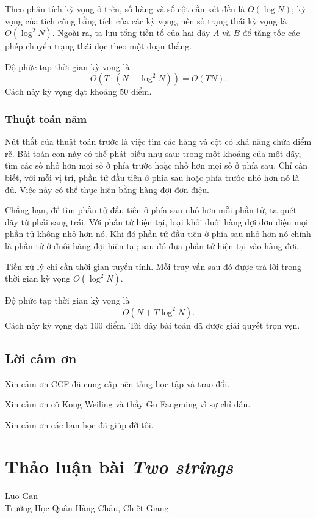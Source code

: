 \documentclass[11pt]{article}
\begin{document}
Theo phân tích kỳ vọng ở trên, số hàng và số cột cần xét đều là
\(O(\log N)\); kỳ vọng của tích cũng bằng tích của các kỳ vọng, nên số trạng
thái kỳ vọng là \(O(\log^2 N)\). Ngoài ra, ta lưu tổng tiền tố của hai dãy
\(A\) và \(B\) để tăng tốc các phép chuyển trạng thái dọc theo một đoạn thẳng.

Độ phức tạp thời gian kỳ vọng là
\[
  O\left(T\cdot (N+\log^2 N)\right)=O(TN).
\]
Cách này kỳ vọng đạt khoảng \(50\) điểm.

\subsubsection{Thuật toán năm}

Nút thắt của thuật toán trước là việc tìm các hàng và cột có khả năng chứa
điểm rẽ. Bài toán con này có thể phát biểu như sau: trong một khoảng của một
dãy, tìm các số nhỏ hơn mọi số ở phía trước hoặc nhỏ hơn mọi số ở phía sau.
Chỉ cần biết, với mỗi vị trí, phần tử đầu tiên ở phía sau hoặc phía trước nhỏ
hơn nó là đủ. Việc này có thể thực hiện bằng hàng đợi đơn điệu.

Chẳng hạn, để tìm phần tử đầu tiên ở phía sau nhỏ hơn mỗi phần tử, ta quét
dãy từ phải sang trái. Với phần tử hiện tại, loại khỏi đuôi hàng đợi đơn điệu
mọi phần tử không nhỏ hơn nó. Khi đó phần tử đầu tiên ở phía sau nhỏ hơn nó
chính là phần tử ở đuôi hàng đợi hiện tại; sau đó đưa phần tử hiện tại vào
hàng đợi.

Tiền xử lý chỉ cần thời gian tuyến tính. Mỗi truy vấn sau đó được trả lời
trong thời gian kỳ vọng \(O(\log^2 N)\).

Độ phức tạp thời gian kỳ vọng là
\[
  O(N+T\log^2 N).
\]
Cách này kỳ vọng đạt \(100\) điểm. Tới đây bài toán đã được giải quyết trọn
vẹn.

\subsection{Lời cảm ơn}

Xin cảm ơn CCF đã cung cấp nền tảng học tập và trao đổi.

Xin cảm ơn cô Kong Weiling và thầy Gu Fangming vì sự chỉ dẫn.

Xin cảm ơn các bạn học đã giúp đỡ tôi.

\section{Thảo luận bài \emph{Two strings}}

\begin{center}
Luo Gan\\
Trường Học Quân Hàng Châu, Chiết Giang
\end{center}
\end{document}
